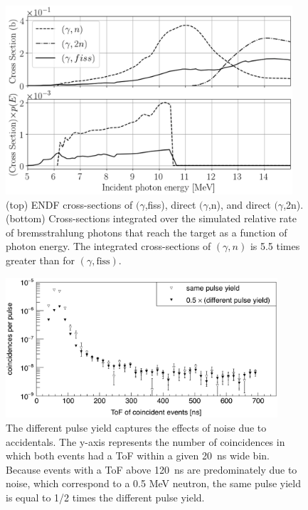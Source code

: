 \begin{figure}[]
\centering
    \includegraphics[width=0.95\textwidth]{Content/Methods/CrossSections.png}
    \caption{(top) ENDF cross-sections of $(\gamma$,fiss), direct $(\gamma$,n), and direct $(\gamma$,2n).
    (bottom) Cross-sections integrated over the simulated relative rate of bremsstrahlung photons that reach the target as a function of photon energy. The integrated cross-sections of $(\gamma, n)$ is 5.5 times greater than for $(\gamma, \text{fiss})$. }
    \label{fig:CrossSection}
\end{figure}
\begin{figure}[]
\centering
    \includegraphics[width=0.9\textwidth]{Content/Methods/NoiseSubtraction.png}
    \caption{The different pulse yield captures the effects of noise due to accidentals.
    The y-axis represents the number of coincidences in which both events had a ToF within a given 20~ns wide bin.
    Because events with a ToF above 120~ns are predominately due to noise, which correspond to a 0.5 MeV neutron, the same pulse yield is equal to 1/2 times the different pulse yield.
    }
    \label{noise_siubtraction}
\end{figure}

